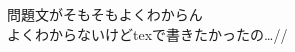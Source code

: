 \documentclass[document]{jarticle}
\begin{document}
        問題文がそもそもよくわからん \\
        よくわからないけどtexで書きたかったの…// \\
    
\end{document}
